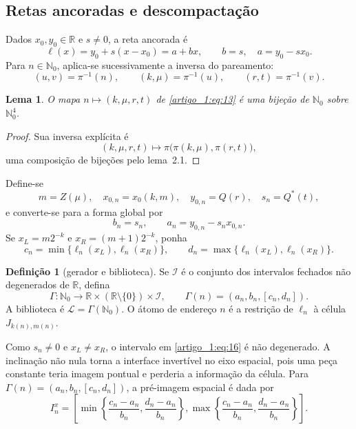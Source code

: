 \documentclass[12pt,a4paper]{article}
\theoremstyle{preciso}
\newtheorem{lema}[teorema]{Lema}
\theoremstyle{definition}
\newtheorem{definicao}[teorema]{Definição}
\newcommand{\N}{\mathbb N}
\newcommand{\R}{\mathbb R}
\newcommand{\LL}{\mathcal L}
\newcommand{\eqn}[2]{\begin{equation}\label{eq:#1}#2\end{equation}}
\theoremstyle{preciso}
\theoremstyle{preciso}
\theoremstyle{preciso}
\theoremstyle{preciso}
\theoremstyle{definition}
\theoremstyle{preciso}
\theoremstyle{definition}
\theoremstyle{preciso}
\theoremstyle{preciso}
\theoremstyle{definition}
\begin{document}
\subsection{Retas ancoradas e descompactação}
Dados $x_0,y_0\in\R$ e $s\ne0$, a reta ancorada é
\eqn{12}{\ell(x)=y_0+s(x-x_0)=a+bx,\qquad b=s,\quad a=y_0-sx_0.}
Para $n\in\N_0$, aplica-se sucessivamente a inversa do pareamento:
\eqn{13}{(u,v)=\pi^{-1}(n),\qquad(k,\mu)=\pi^{-1}(u),\qquad(r,t)=\pi^{-1}(v).}
\begin{lema}\label{map:artigo_1:3.2}
O mapa $n\mapsto(k,\mu,r,t)$ de \eqref{artigo_1:eq:13} é uma bijeção de $\N_0$ sobre $\N_0^4$.
\end{lema}
\begin{proof}
Sua inversa explícita é
\[
(k,\mu,r,t)\longmapsto\pi\bigl(\pi(k,\mu),\pi(r,t)\bigr),
\]
uma composição de bijeções pelo lema~2.1.
\end{proof}
Define-se
\eqn{14}{m=Z(\mu),\quad x_{0,n}=x_0(k,m),\quad y_{0,n}=Q(r),\quad s_n=Q^*(t),}
e converte-se para a forma global por
\eqn{15}{b_n=s_n,\qquad a_n=y_{0,n}-s_nx_{0,n}.}
Se $x_L=m2^{-k}$ e $x_R=(m+1)2^{-k}$, ponha
\eqn{16}{c_n=\min\{\ell_n(x_L),\ell_n(x_R)\},\qquad d_n=\max\{\ell_n(x_L),\ell_n(x_R)\}.}
\begin{definicao}[gerador e biblioteca]\label{map:artigo_1:3.3}
Se $\mathcal I$ é o conjunto dos intervalos fechados não degenerados de $\R$, defina
\eqn{17}{\Gamma:\N_0\to\R\times(\R\setminus\{0\})\times\mathcal I,\qquad
\Gamma(n)=(a_n,b_n,[c_n,d_n]).}
A biblioteca é $\LL=\Gamma(\N_0)$. O átomo de endereço $n$ é a restrição de $\ell_n$ à célula $J_{k(n),m(n)}$.
\end{definicao}
Como $s_n\ne0$ e $x_L\ne x_R$, o intervalo em \eqref{artigo_1:eq:16} é não degenerado. A inclinação não nula torna a interface invertível no eixo espacial, pois uma peça constante teria imagem pontual e perderia a informação da célula. Para $\Gamma(n)=(a_n,b_n,[c_n,d_n])$, a pré-imagem espacial é dada por
\eqn{18}{I_n^x=\left[
\min\left\{\frac{c_n-a_n}{b_n},\frac{d_n-a_n}{b_n}\right\},
\max\left\{\frac{c_n-a_n}{b_n},\frac{d_n-a_n}{b_n}\right\}\right].}
\end{document}
